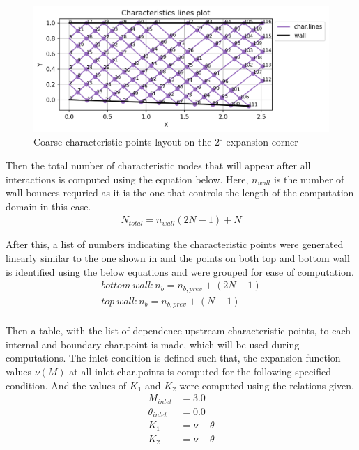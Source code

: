 \begin{figure}
   \center
    \includegraphics[scale=0.9]{results/expansion_corner_trial/char_map.png}
    \caption{Coarse characteristic points layout on the $2^{\circ}$ expansion corner}
    \label{domain_layout}
\end{figure}

\par Then the total number of characteristic nodes that will appear after all
interactions is computed using the equation below. Here, $n_{wall}$ is the number
of wall bounces requried as it is the one that controls the length of the
computation domain in this case. \\
\begin{align*}
    N_{total} = n_{wall} (2 N - 1) + N
\end{align*}

\par After this, a list of numbers indicating the characteristic points were
generated linearly similar to the one shown in  and the
points on both top and bottom wall is identified using the below equations
and were grouped for ease of computation.
\begin{align*}
    bottom\ wall: n_b = n_{b,prev} + (2N -1) \\
    top\ wall: n_b = n_{b,prev} + (N -1) \\
\end{align*}

\par Then a table, with the list of dependence upstream characteristic points,
to each internal and boundary char.point is made, which will be used during
computations. The inlet condition is defined such that, the expansion function
values $\nu(M)$ at all inlet char.points is computed for the following specified
condition. And the values of $K_1$ and $K_2$ were computed using the relations
given.
\begin{align*}
    M_{inlet} &= 3.0  \\
    \theta_{inlet} &= 0.0 \\
    K_1 &= \nu + \theta \\
    K_2 &= \nu - \theta
\end{align*}

